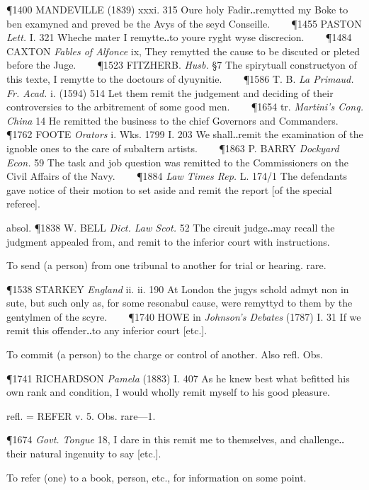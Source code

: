\begin{description}[wide, labelwidth=!, labelindent=0pt]
\begin{myenumerate}
\P 1400 MANDEVILLE  (1839) xxxi. 315 Oure holy Fadir‥remytted my Boke to ben examyned and preved be the Avys of the seyd Conseille.    
\P 1455 PASTON  \textit{Lett.} I. 321 Wheche mater I remytte‥to youre ryght wyse discrecion.    
\P 1484 CAXTON  \textit{Fables of Alfonce} ix, They remytted the cause to be discuted or pleted before the Juge.    
\P 1523 FITZHERB.  \textit{Husb.} §7 The spirytuall constructyon of this texte, I remytte to the doctours of dyuynitie.    
\P 1586 T. B. \textit{La Primaud. Fr. Acad.} i. (1594) 514 Let them remit the judgement and deciding of their controversies to the arbitrement of some good men.    
\P 1654 tr.  \textit{Martini's Conq. China} 14 He remitted the business to the chief Governors and Commanders.    
\P 1762 FOOTE  \textit{Orators} i. Wks. 1799 I. 203  We shall‥remit the examination of the ignoble ones to the care of subaltern artists.    
\P 1863 P. BARRY  \textit{Dockyard Econ.} 59 The task and job question was remitted to the Commissioners on the Civil Affairs of the Navy.    
\P 1884  \textit{Law Times Rep.} L. 174/1 The defendants gave notice of their motion to set aside and remit the report [of the special referee].

absol. \P 1838 W. BELL  \textit{Dict. Law Scot.} 52 The circuit judge‥may recall the judgment appealed from, and remit to the inferior court with instructions.

 To send (a person) from one tribunal to another for trial or hearing. rare.

\P 1538 STARKEY  \textit{England} ii. ii. 190 At London the jugys schold admyt non in sute, but such only as, for some resonabul cause, were remyttyd to them by the gentylmen of the scyre.    
\P 1740 HOWE in  \textit{Johnson's Debates} (1787) I. 31 If we remit this offender‥to any inferior court [etc.].

 To commit (a person) to the charge or control of another. Also refl. Obs.

\P 1741 RICHARDSON  \textit{Pamela} (1883) I. 407 As he knew best what befitted his own rank and condition, I would wholly remit myself to his good pleasure.

 refl. = REFER v. 5. Obs. rare—1.

\P 1674  \textit{Govt. Tongue} 18, I dare in this remit me to themselves, and challenge‥their natural ingenuity to say [etc.].

 To refer (one) to a book, person, etc., for information on some point.


\end{myenumerate}
\end{description}
